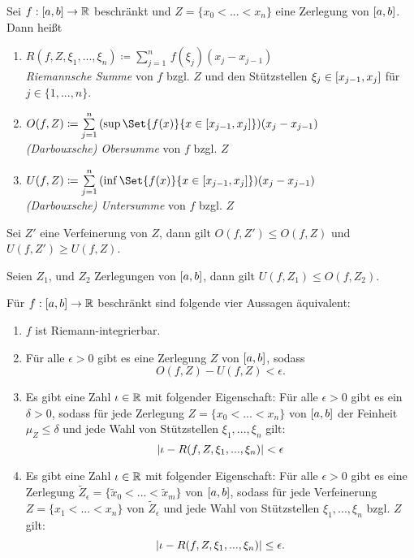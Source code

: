 \documentclass{cheat-sheet}
\begin{document}
\begin{defn}
Sei $f : \left[ a, b \right] \to \mathbb{R}$ beschränkt und $Z = \{ x_0 < ... < x_n \}$ eine Zerlegung von $\left[ a, b \right]$. Dann heißt

\begin{enumerate}
  \item
    $R(f, Z, \xi_1, ..., \xi_n) \coloneqq \sum_{j=1}^{n}\,f(\xi_j)(x_j - x_{j-1})$\\
    \emph{Riemannsche Summe} von $f$ bzgl. $Z$ und den Stützstellen $\xi_j \in \left[ x_{j-1}, x_j \right]$ für $j \in \{ 1, ..., n \}$.
  \item
    $O(f, Z) \coloneqq \sum_{j=1}^{n}\,(\sup\Set{f(x)}{x \in \cinterval{x_{j-1}}{x_j}})(x_j - x_{j-1})$\\
    \emph{(Darbouxsche) Obersumme} von $f$ bzgl. $Z$
  \item
    $U(f, Z) \coloneqq \sum_{j=1}^{n}\,(\inf\Set{f(x)}{x \in \cinterval{x_{j-1}}{x_j}})(x_j - x_{j-1})$\\
    \emph{(Darbouxsche) Untersumme} von $f$ bzgl. $Z$
\end{enumerate}
\end{defn}

\begin{bem}
Sei $Z'$ eine Verfeinerung von $Z$, dann gilt $O(f, Z') \le O(f, Z)$ und $U(f, Z') \ge U(f, Z)$.
\end{bem}

\begin{satz}
Seien $Z_1$, und $Z_2$ Zerlegungen von $\left[ a, b \right]$, dann gilt $U(f, Z_1) \le O(f, Z_2)$.
\end{satz}

\begin{satz}
Für $f : \left[ a, b \right] \to \mathbb{R}$ beschränkt sind folgende vier Aussagen äquivalent:

\begin{enumerate}
  \item $f$ ist Riemann-integrierbar.
  \item Für alle $\epsilon > 0$ gibt es eine Zerlegung $Z$ von $\left[ a, b \right]$, sodass
    \[ O(f, Z) - U(f, Z) < \epsilon. \]
  \item Es gibt eine Zahl $\iota \in \mathbb{R}$ mit folgender Eigenschaft: Für alle $\epsilon > 0$ gibt es ein $\delta > 0$, sodass für jede Zerlegung $Z = \{ x_0 < ... < x_n \}$ von $\left[ a, b \right]$ der Feinheit $\mu_Z \le \delta$ und jede Wahl von Stützstellen $\xi_1, ..., \xi_n$ gilt:
  \[ \lvert\iota - R(f, Z, \xi_1, ..., \xi_n)\rvert < \epsilon \]
  \item Es gibt eine Zahl $\iota \in \mathbb{R}$ mit folgender Eigenschaft: Für alle $\epsilon > 0$ gibt es eine Zerlegung $\widetilde{Z}_{\epsilon} = \{ \widetilde{x}_0 < ... < \widetilde{x}_m \}$ von $\left[ a, b \right]$, sodass für jede Verfeinerung $Z = \{ x_1 < ... < x_n \}$ von $\widetilde{Z}_{\epsilon}$ und jede Wahl von Stützstellen $\xi_1, ..., \xi_n$ bzgl. $Z$ gilt:
  \[ \lvert\iota - R(f, Z, \xi_1, ..., \xi_n)\rvert \le \epsilon. \]
\end{enumerate}
\end{satz}
\end{document}
